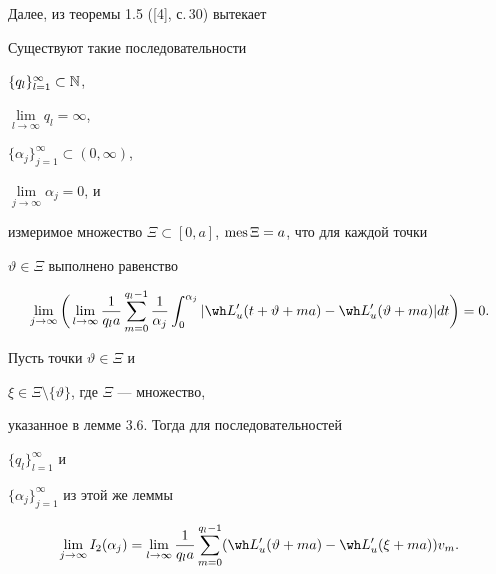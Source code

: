 Далее, из теоремы 1.5 ([4], с.\,30) вытекает





\begin{lems}


Существуют такие последовательности


$\{q_l\}_{l=1}^\infty\subset\Bbb N$,


$\lim\limits_{l\to\infty}q_l=\infty$,


$\{\alpha_j\}_{j=1}^\infty\subset(0,\infty)$,


$\lim\limits_{j\to\infty}\alpha_j=0$, и


измеримое множество $\Xi\subset[0,a]$, $\operatorname{mes}\Xi=a$, что для каждой точки


$\vartheta\in\Xi$ выполнено равенство


\begin{equation}


\lim_{j\to\infty}\bigg(\lim_{l\to\infty}\frac{1}{q_la}


\sum_{m=0}^{q_l-1}


\frac{1}{\alpha_j}\int_0^{\alpha_j}


|\wh L'_{u}(t+\vartheta+ma)-\wh L'_{u}(\vartheta+ma)|dt\bigg)=0.


\end{equation}


\end{lems}





\begin{lems}


Пусть точки $\vartheta\in\Xi$ и


$\xi\in\Xi\setminus\{\vartheta\}$, где $\Xi$ --- множество,


указанное в лемме $3.6$. Тогда для последовательностей


$\{q_l\}_{l=1}^\infty$ и


$\{\alpha_j\}_{j=1}^\infty$ из этой же леммы


\begin{equation}


\lim_{j\to\infty}I_2(\alpha_j)=


\lim_{l\to\infty}\frac{1}{q_la}\sum_{m=0}^{q_l-1}


(\wh L'_{u}(\vartheta+ma)-\wh L'_{u}(\xi+ma))v_m.


\end{equation}


\end{lems}





